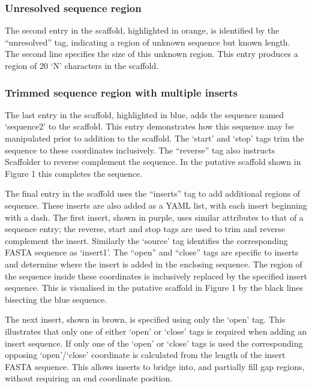 \documentclass[10pt]{bmc_article}
\newenvironment{bmcformat}{\begin{raggedright}\baselineskip20pt\sloppy\setboolean{publ}{false}}{\end{raggedright}\baselineskip20pt\sloppy}
\begin{document}
\begin{bmcformat}
\subsubsection*{Unresolved sequence region} %

The second entry in the scaffold, highlighted in orange, is identified by the
``unresolved'' tag, indicating a region of unknown sequence but known length.
The second line specifies the size of this unknown region. This entry produces
a region of 20 `N' characters in the scaffold. \pb

\subsubsection*{Trimmed sequence region with multiple inserts} %

The last entry in the scaffold, highlighted in blue, adds the sequence named
`sequence2' to the scaffold. This entry demonstrates how this sequence may be
manipulated prior to addition to the scaffold. The `start' and `stop' tags trim
the sequence to these coordinates inclusively. The ``reverse'' tag also
instructs Scaffolder to reverse complement the sequence. In the putative
scaffold shown in Figure 1 this completes the sequence. \pb

The final entry in the scaffold uses the ``inserts'' tag to add additional
regions of sequence. These inserts are also added as a YAML list, with each
insert beginning with a dash. The first insert, shown in purple, uses similar
attributes to that of a sequence entry; the reverse, start and stop tags are
used to trim and reverse complement the insert. Similarly the `source' tag
identifies the corresponding FASTA sequence as `insert1'. The ``open'' and
``close'' tags are specific to inserts and determine where the insert is added
in the enclosing sequence. The region of the sequence inside these coordinates
is inclusively replaced by the specified insert sequence. This is visualised in
the putative scaffold in Figure 1 by the black lines bisecting the blue
sequence. \pb

The next insert, shown in brown, is specified using only the `open' tag. This
illustrates that only one of either `open' or `close' tags is required when
adding an insert sequence. If only one of the `open' or `close' tags is used
the corresponding opposing `open'/`close' coordinate is calculated from the
length of the insert FASTA sequence. This allows inserts to bridge into, and
partially fill gap regions, without requiring an end coordinate position. \pb


\end{bmcformat}
\end{document}
